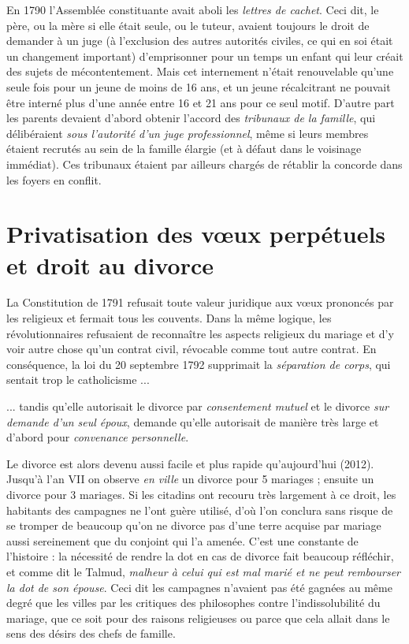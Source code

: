  En 1790 l'Assemblée constituante avait aboli les \emph{lettres de cachet}. Ceci dit, le père, ou la mère si elle était seule, ou le tuteur, avaient toujours le droit de demander à un juge (à l'exclusion des autres autorités civiles, ce qui en soi était un changement important) d'emprisonner pour un temps un enfant qui leur créait des sujets de mécontentement. Mais cet internement n'était renouvelable qu'une seule fois pour un jeune de moins de 16 ans, et un jeune récalcitrant ne pouvait être interné plus d'une année entre 16 et 21 ans pour ce seul motif. D'autre part les parents devaient d'abord obtenir l'accord des \emph{tribunaux de la famille}, qui délibéraient \emph{sous l'autorité d'un juge professionnel}, même si leurs membres étaient recrutés au sein de la famille élargie (et à défaut dans le voisinage immédiat). Ces tribunaux étaient par ailleurs chargés de rétablir la concorde dans les foyers en conflit. 


\section{Privatisation des vœux perpétuels et droit au divorce}

 La Constitution de 1791 refusait toute valeur juridique aux vœux prononcés par les religieux et fermait tous les couvents. Dans la même logique, les révolutionnaires refusaient de reconnaître les aspects religieux du mariage et d'y voir autre chose qu'un contrat civil, révocable comme tout autre contrat. En conséquence, la loi du 20 septembre 1792 supprimait la \emph{séparation de corps}, qui sentait trop le catholicisme ...

 ... tandis qu'elle autorisait le divorce par \emph{consentement mutuel} et le divorce \emph{sur demande d'un seul époux}, demande qu'elle autorisait de manière très large et d'abord pour \emph{convenance personnelle}. 

 Le divorce est alors devenu aussi facile et plus rapide qu'aujourd'hui (2012). Jusqu'à l'an VII on observe \emph{en ville} un divorce pour 5 mariages ; ensuite un divorce pour 3 mariages. Si les citadins ont recouru très largement à ce droit, les habitants des campagnes ne l'ont guère utilisé, d'où l'on conclura sans risque de se tromper de beaucoup qu'on ne divorce pas d'une terre acquise par mariage aussi sereinement que du conjoint qui l'a amenée. C'est une constante de l'histoire : la nécessité de rendre la dot en cas de divorce fait beaucoup réfléchir, et comme dit le Talmud, \emph{malheur à celui qui est mal marié et ne peut rembourser la dot de son épouse}. Ceci dit les campagnes n'avaient pas été gagnées au même degré que les villes par les critiques des philosophes contre l'indissolubilité du mariage, que ce soit pour des raisons religieuses ou parce que cela allait dans le sens des désirs des chefs de famille. 

